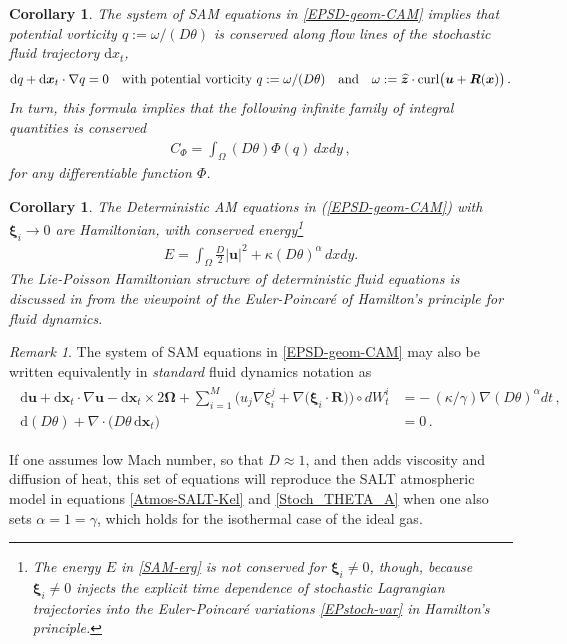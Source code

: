 \documentclass[11pt, oneside]{article}   	%
\numberwithin{equation}{section}
\theoremstyle{plain}
\newtheorem{corollary}[theorem]{Corollary}
\theoremstyle{definition}
\theoremstyle{remark}
\newtheorem{remark}[theorem]{Remark}
\newcommand{\<}{\langle}
\renewcommand{\>}{\rangle}
\def\rmd{{\mathrm{d}}}
\newcommand{\bs}[1]{\boldsymbol{#1}}
\begin{document}
\begin{corollary}\label{CAM-PV}
  The system of SAM equations in \eqref{EPSD-geom-CAM} implies that
  potential vorticity $q:= \omega / (D\theta)$ is conserved along flow lines of the stochastic fluid
  trajectory ${\rmd}x_t$,
\begin{align}
{\rmd} q +{\rmd}\bs{x}_t \cdot\nabla q = 0
\quad\hbox{with potential vorticity }q:= \omega / (D\theta) 
\quad\hbox{and} \quad
\omega := \bs{\widehat{z}}\cdot{\rm curl}\big( \bs{u} + \bs{R}(\bs{x}) \big) 
\,.
\label{SAM-vorticitythm}
\end{align}
In turn, this formula implies that the following infinite family of integral quantities is conserved
\begin{align}
C_\Phi = \int_\Omega (D\theta)\Phi(q)\,dxdy
\,,
\label{SAM-enstrophy-thm}
\end{align}
for any differentiable function $\Phi$.
\end{corollary}
\begin{corollary}
The \emph{Deterministic} AM equations in (\ref{EPSD-geom-CAM}) with $\bs{\xi}_i\to0$ are Hamiltonian, with conserved energy\footnote{The energy $E$ in \eqref{SAM-erg} is not conserved for $\bs{\xi}_i\ne0$, though, because $\bs{\xi}_i\ne0$ injects the explicit time dependence of stochastic Lagrangian trajectories into the Euler-Poincar\'e variations \eqref{EPstoch-var} in Hamilton's principle.}
\begin{align}
E = \int_{\Omega} \frac{D}{2} |\bs{u}|^2 + \kappa (D\theta)^\alpha \,dxdy.
\label{SAM-erg}
\end{align}
The Lie-Poisson Hamiltonian structure of deterministic fluid equations is discussed in \cite{HMR1998} from the viewpoint of the Euler-Poincar\'e of Hamilton's principle for fluid dynamics. 
\end{corollary}
\begin{remark}
The system of SAM equations in \eqref{EPSD-geom-CAM} may also be written equivalently in \emph{standard} fluid dynamics notation as
\begin{align}
\begin{split}
{\rmd} \bs{u} + {\rmd}\bs{x}_t \cdot\nabla \bs{u} - {\rmd}\bs{x}_t  \times 2 \bs{\Omega}
 + \sum_{i=1}^M \Big( u_j  \nabla  \xi_i^j  +  \nabla \big(\bs{\xi}_i  \cdot \bs{R}\big)\Big) \circ dW_t^i 
&=  -\,(\kappa/\gamma) \nabla (D\theta)^\alpha  dt
\,, \\
{\rmd} (D\theta) + \nabla  \cdot \big( D\theta\, {\rmd}\bs{x}_t  \big) & =  0
\,.\end{split}
\label{Eady-EPSDeqns2}
\end{align}
\end{remark}
If one assumes low Mach number, so that $D\approx1$, and then adds viscosity and diffusion of heat, this set of equations will reproduce the SALT atmospheric model in equations \eqref{Atmos-SALT-Kel} and \eqref{Stoch_THETA_A} when one also sets $\alpha=1=\gamma$, which holds for the isothermal case of the ideal gas. 
\end{document}
